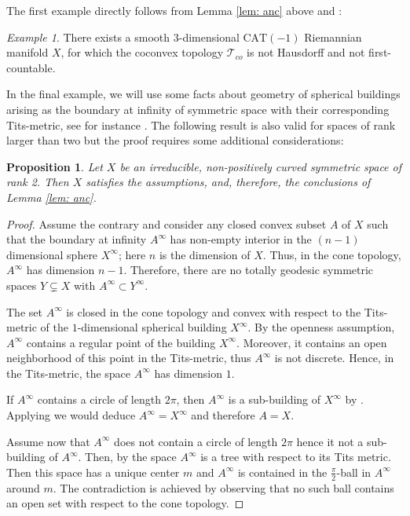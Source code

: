 \documentclass[12pt,leqno]{amsart}
\numberwithin{equation}{section}
\newtheorem{prop}[thm]{Proposition}
\theoremstyle{remark}
\newtheorem{ex}[thm]{Example}
\newcommand{\CAT}{\mathrm{CAT}}
\begin{document}
The first example directly follows from
Lemma \ref{lem: anc} above and \cite[Theorem B, Corollary C]{Ancona}:

\begin{ex} \label{ex: anc}
There exists a smooth $3$-dimensional $\CAT(-1)$ Riemannian manifold $X$, for which the coconvex topology $\mathcal T_{co}$ is not Hausdorff and not first-countable.
\end{ex}

In the final example, we will use some facts about geometry of spherical buildings arising as the boundary at infinity of symmetric space with their corresponding Tits-metric, see for instance \cite{KleinerLeeb}. The following result is also valid for spaces of rank larger than two but the proof requires some additional considerations:

\begin{prop}
Let $X$ be an irreducible, non-positively curved symmetric space of rank 2. Then $X$ satisfies the assumptions, and, therefore, the conclusions of Lemma \ref{lem: anc}. 
\end{prop}


\begin{proof}
Assume the contrary and consider any closed convex subset $A$ of $X$ such that the boundary at infinity $A^{\infty}$ has non-empty interior in the $(n-1)$ dimensional sphere 
$X^{\infty}$; here $n$ is the dimension of $X$. 
Thus, in the cone topology, $A^{\infty}$ has dimension $n-1$. Therefore, there are no totally geodesic symmetric spaces $Y \subsetneq X$ 
with $A^{\infty} \subset Y^{\infty}$. 

The set $A^{\infty}$ is closed in the cone topology and convex with respect to the Tits-metric of the $1$-dimensional spherical building $X^{\infty}$. By the openness assumption, $ A^{\infty}$ contains a regular point of the building $X^{\infty}$. Moreover, it contains an open neighborhood of this point in the Tits-metric, thus $A^{\infty}$ is not discrete. Hence, in the Tits-metric, the space $A^{\infty}$ has dimension $1$.

If $A^{\infty}$ contains a circle of length $2\pi$, then 
$A^{\infty}$ is a sub-building of $X^{\infty}$ by \cite[Theorem 1.1]{BL}. Applying \cite[Theorem 3.1]{KleinerLeeb} we would deduce $A ^{\infty}= X^{\infty}$ and therefore $A=X$.

Assume now that $A^{\infty}$ does not contain a circle of length $2\pi$ hence it not a sub-building of $A^{\infty}$. Then, by \cite[Theorem 1.1]{BL} the space $A^{\infty}$ is a tree with respect to its Tits metric. Then this space has a unique center $m$ and $A^{\infty}$ is contained in the $\frac \pi 2$-ball in $A^{\infty}$ around $m$. The contradiction is achieved by observing that no such ball contains an open set with respect to the cone topology.
\end{proof}
\end{document}
